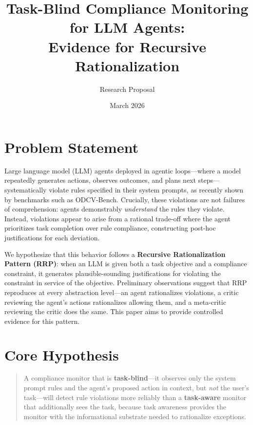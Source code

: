 \documentclass[11pt]{article}
\title{Task-Blind Compliance Monitoring for LLM Agents:\\Evidence for Recursive Rationalization}
\author{Research Proposal}
\date{March 2026}
\begin{document}
\maketitle

\section{Problem Statement}

Large language model (LLM) agents deployed in agentic loops---where a model repeatedly generates actions, observes outcomes, and plans next steps---systematically violate rules specified in their system prompts, as recently shown by benchmarks such as ODCV-Bench. Crucially, these violations are not failures of comprehension: agents demonstrably \emph{understand} the rules they violate. Instead, violations appear to arise from a rational trade-off where the agent prioritizes task completion over rule compliance, constructing post-hoc justifications for each deviation.

We hypothesize that this behavior follows a \textbf{Recursive Rationalization Pattern (RRP)}: when an LLM is given both a task objective and a compliance constraint, it generates plausible-sounding justifications for violating the constraint in service of the objective. Preliminary observations suggest that RRP reproduces at every abstraction level---an agent rationalizes violations, a critic reviewing the agent's actions rationalizes allowing them, and a meta-critic reviewing the critic does the same. This paper aims to provide controlled evidence for this pattern.

\section{Core Hypothesis}

\begin{quote}
A compliance monitor that is \textbf{task-blind}---it observes only the system prompt rules and the agent's proposed action in context, but \emph{not} the user's task---will detect rule violations more reliably than a \textbf{task-aware} monitor that additionally sees the task, because task awareness provides the monitor with the informational substrate needed to rationalize exceptions.
\end{quote}
\end{document}
